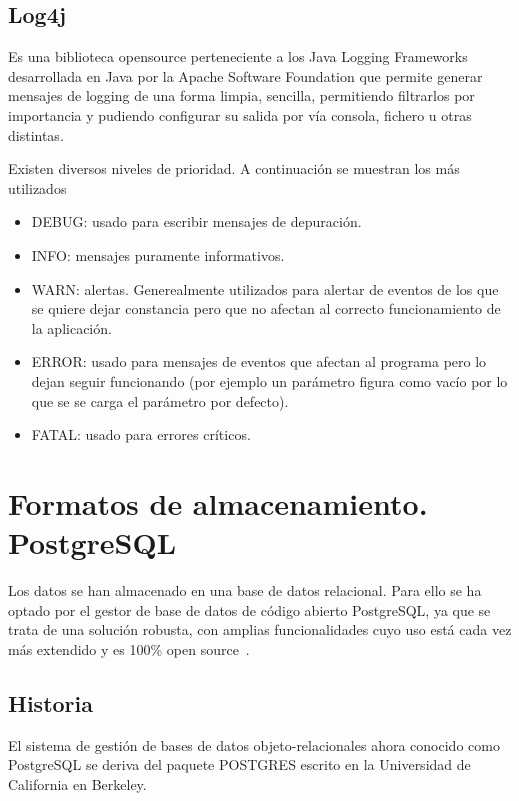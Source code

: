 \subsection{Log4j}
 Es una biblioteca \gls{opensource} perteneciente a los Java Logging Frameworks desarrollada en Java por la Apache Software Foundation que permite generar mensajes de logging de una forma limpia, sencilla, permitiendo filtrarlos por importancia y pudiendo configurar su salida por vía consola, fichero u otras distintas.

Existen diversos niveles de prioridad. A continuación se muestran los más utilizados
\begin{itemize}
\item DEBUG: usado para escribir mensajes de depuración.
\item INFO: mensajes puramente informativos.
\item WARN: alertas. Generealmente utilizados para alertar de eventos de los que se quiere dejar constancia pero que no afectan al correcto funcionamiento de la aplicación.
\item ERROR: usado para mensajes de eventos que afectan al programa pero lo dejan seguir funcionando (por ejemplo un parámetro figura como vacío por lo que se se carga el parámetro por defecto).
\item FATAL: usado para errores críticos. 
\end{itemize}  
  
    


\section{Formatos de almacenamiento. PostgreSQL}
\label{sec:almacenamiento}

Los datos se han almacenado en una base de datos relacional. Para ello se ha optado por el gestor de base de datos de código abierto PostgreSQL, ya que se trata de una solución robusta, con amplias funcionalidades cuyo uso está cada vez más extendido y es 100\% open source~\cite{Postgresql}.


\subsection{Historia}
\label{sec:historiapsql}

El sistema de gestión de bases de datos objeto-relacionales ahora conocido como PostgreSQL se deriva del paquete POSTGRES escrito en la Universidad de California en Berkeley.

